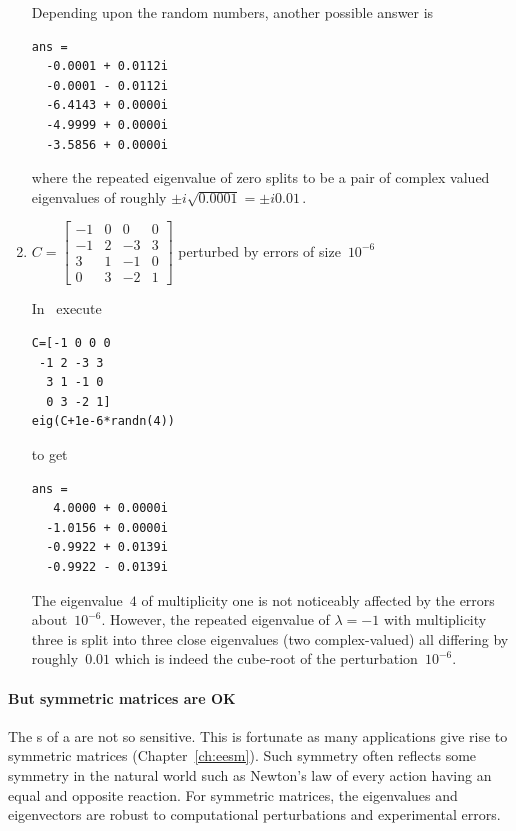 \begin{example}
\begin{enumerate}
\begin{solution}
Depending upon the random numbers, another possible answer is
\begin{verbatim}
ans =
  -0.0001 + 0.0112i
  -0.0001 - 0.0112i
  -6.4143 + 0.0000i
  -4.9999 + 0.0000i
  -3.5856 + 0.0000i
\end{verbatim}
\end{solution}
where the repeated eigenvalue of zero splits to be a pair of complex valued eigenvalues of roughly \(\pm i\sqrt{0.0001}=\pm i0.01\)\,.

\item \(C=\begin{bmatrix}-1&0&0&0
\\-1&2&-3&3
\\3&1&-1&0
\\0&3&-2&1\end{bmatrix}\) perturbed by errors of size~\(10^{-6}\)
\begin{solution} 
In \script\ execute
\begin{verbatim}
C=[-1 0 0 0
 -1 2 -3 3
  3 1 -1 0
  0 3 -2 1]
eig(C+1e-6*randn(4))
\end{verbatim}
\setbox\ajrqrbox\hbox{}%
\marginpar{\usebox{\ajrqrbox}}%
to get
\begin{verbatim}
ans =
   4.0000 + 0.0000i
  -1.0156 + 0.0000i
  -0.9922 + 0.0139i
  -0.9922 - 0.0139i
\end{verbatim}
The eigenvalue~\(4\) of multiplicity one is not noticeably affected by the errors about~\(10^{-6}\).
However, the repeated eigenvalue of \(\lambda=-1\) with multiplicity three is split into three close eigenvalues (two complex-valued) all differing by roughly~\(0.01\) which is indeed the cube-root of the perturbation~\(10^{-6}\).
\end{solution}

\end{enumerate}
\end{example}



\paragraph{But symmetric matrices are OK}
The s of a  are not so sensitive.
This is fortunate as many applications give rise to symmetric matrices (Chapter~\ref{ch:eesm}).
Such symmetry often reflects some symmetry in the natural world such as Newton's law of every action having an equal and opposite reaction.
For symmetric matrices, the eigenvalues and eigenvectors are robust to computational perturbations and experimental errors.

